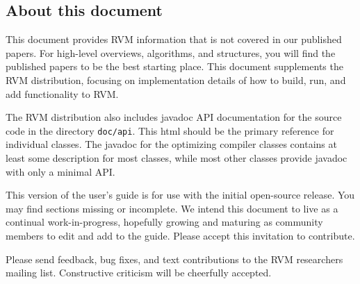 \subsection {About this document}

This document provides RVM information that is not covered in
our published papers.  For high-level overviews, algorithms, and
structures, you will find the published papers to be the best starting
place. This document supplements
the RVM distribution, focusing on implementation
details of how to build, run, and add functionality to RVM.

The RVM distribution also includes javadoc API documentation for the 
source code in the directory {\tt doc/api}.  This html should be the
primary reference for individual classes.  The javadoc for the optimizing
compiler classes contains at least some description for most classes,
while most other classes provide javadoc with only a minimal API.

This version of the user's guide is for use with the initial open-source
release.  You may find sections missing or incomplete. We intend this
document to live as a continual work-in-progress, hopefully growing
and maturing as community members to edit and add to the
guide.  Please accept this invitation to contribute.

Please send feedback, bug fixes, and text contributions to the RVM
researchers mailing list.  Constructive criticism will be cheerfully 
accepted. 
